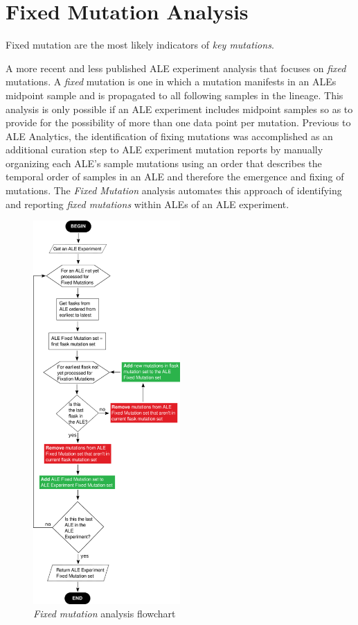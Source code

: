 \documentclass[12pt,final,masters,chapterheads]{ucsd}  %
\begin{document}
\section{Fixed Mutation Analysis}

Fixed mutation are the most likely indicators of \textit{key mutations}.

A more recent and less published ALE experiment analysis that focuses on \textit{fixed} mutations. A \textit{fixed} mutation is one in which a mutation manifests in an ALEs midpoint sample and is propagated to all following samples in the lineage. This analysis is only possible if an ALE experiment includes midpoint samples so as to provide for the possibility of more than one data point per mutation. Previous to ALE Analytics, the identification of fixing mutations was accomplished as an additional curation step to ALE experiment mutation reports by manually organizing each ALE's sample mutations using an order that describes the temporal order of samples in an ALE and therefore the emergence and fixing of mutations. The \textit{Fixed Mutation} analysis automates this approach of identifying and reporting \textit{fixed mutations} within ALEs of an ALE experiment.

\begin{figure}[h!]
  \caption{\textit{Fixed mutation} analysis flowchart}
  \centering
  \includegraphics[width=0.50\textwidth]{fixation_mutation_flowchart.png}
\end{figure}
\end{document}
